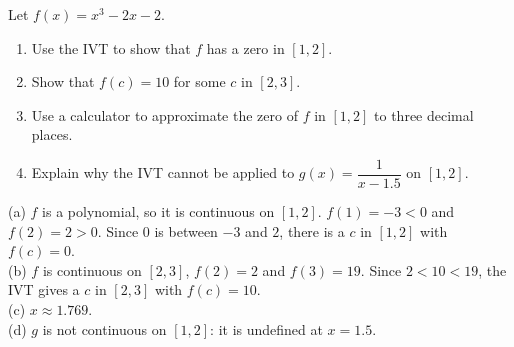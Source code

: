 \begin{exo}{\calcreq}
Let $f(x)=x^3-2x-2$.
\begin{enumerate}[label=(\alph*)]
\item Use the IVT to show that $f$ has a zero in $[1,2]$.
\item Show that $f(c)=10$ for some $c$ in $[2,3]$.
\item Use a calculator to approximate the zero of $f$ in $[1,2]$ to three decimal places.
\item Explain why the IVT cannot be applied to $g(x)=\dfrac{1}{x-1.5}$ on $[1,2]$.
\end{enumerate}
\begin{solution}
(a) $f$ is a polynomial, so it is continuous on $[1,2]$. $f(1)=-3<0$ and $f(2)=2>0$. Since $0$ is between $-3$ and $2$, there is a $c$ in $[1,2]$ with $f(c)=0$.\\
(b) $f$ is continuous on $[2,3]$, $f(2)=2$ and $f(3)=19$. Since $2<10<19$, the IVT gives a $c$ in $[2,3]$ with $f(c)=10$.\\
(c) $x\approx1.769$.\\
(d) $g$ is not continuous on $[1,2]$: it is undefined at $x=1.5$.
\end{solution}
\end{exo}
